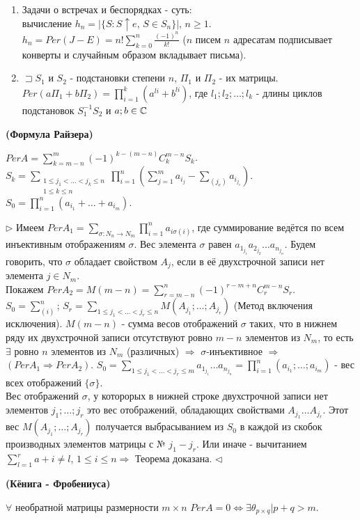 \begin{enumerate}
    \item Задачи о встречах и беспорядках - суть: \\вычисление $h_n=|\{S:S\uparrow e$, $S\in S_n \}|$, $n \geq 1$. \\$h_n=Per(J - E)=n! \sum\limits_{k=0}^n \frac{(-1)^n}{k!}$ ($n$ писем $n$ адресатам подписывает конверты и случайным образом вкладывает письма).
    \item $\sqsupset S_1$ и $S_2$ - подстановки степени $n$, $\Pi_1$ и $\Pi_2$ - их матрицы. \\$Per(a\Pi_1+b\Pi_2) = \prod\limits_{i=1}^k (a^{li}+b^{li})$, где $l_1;l_2;\ldots;l_k$ - длины циклов подстановок $S^{-1}_1 S_2$ и $a;b \in \mathbb{C}$
\end{enumerate}

\thr \textbf{(Формула Райзера)}

$PerA=\sum\limits_{k=m-n}^m(-1)^{k-(m-n)}C^{m-n}_k S_k$.\\$S_k=\sum\limits_{\substack{1 \leq j_1 < \ldots < j_k \leq n\\1 \leq k \leq n}} \prod\limits_{i=1}^n(\sum\limits_{j=1}^m a_{i_j} -\sum\limits_{(j_e)} a_{i_{j_e}})$. 
$S_0=\prod\limits_{i=1}^n(a_{i_1}+\ldots+a_{i_m})$.

\proof
$\rhd$ Имеем $PerA_1=\sum\limits_{\sigma:N_n \rightarrow N_m}\prod\limits_{i=1}^n a_{i\sigma(i)}$, где суммирование ведётся по всем инъективным отображениям $\sigma$. Вес элемента $\sigma$ равен $a_{1_{j_1}}a_{2_{j_2}}\ldots a_{n_{j_n}}$. Будем говорить, что $\sigma$ обладает свойством $A_j$, если в её двухстрочной записи нет элемента $j\in N_m$. \\
Покажем $PerA_2=M(m-n)=\sum\limits_{r=m-n}^n (-1)^{r-m+n}C^{m-n}_r S_r$.\\ $S_0=\sum\limits_{(i)}^n$; $S_r=\sum\limits_{1\leq j_1<\ldots<j_r\leq n}M(A_{j_1};\ldots;A_{j_r})$ (Метод включения исключения).
$M(m-n)$ - сумма весов отображений $\sigma$ таких, что в нижнем ряду их двухстрочной записи отсутствуют ровно $m-n$ элементов из $N_m$, то есть $\exists$ ровно $n$ элементов из $N_m$ (различных) $\Rightarrow$ $\sigma$-инъективное $\Rightarrow$ $(PerA_1 \Rightarrow PerA_2)$.
$S_0=\sum\limits_{1\leq j_1<\ldots<j_r\leq m}a_{1_{j_1}}\ldots a_{n_{j_n}}=\prod\limits_{i=1}^n(a_{i_1};\ldots;a_{i_m})$ - вес всех отображений $\{\sigma\}$.
\\Вес отображений $\sigma$, у которорых в нижней строке двухстрочной записи нет элементов $j_1;\ldots;j_r$ это вес отображений, обладающих свойствами $A_{j_1}\ldots A_{j_r}$. Этот вес $M(A_{j_1};\ldots;A_{j_r})$ получается выбрасыванием из $S_0$ в каждой из скобок производных элементов матрицы с № $j_1-j_r$. Или иначе - вычитанием $\sum\limits_{l=1}^r a+i\neq l$, $1\leq i\leq n \Rightarrow$ Теорема доказана. $\triangleleft$


\thr \textbf{(Кёнига - Фробениуса)}

$\forall$ необратной матрицы размерности $m\times n$ 
$PerA=0 \Leftrightarrow \exists  \theta_{p\times q}| p+q>m$.
